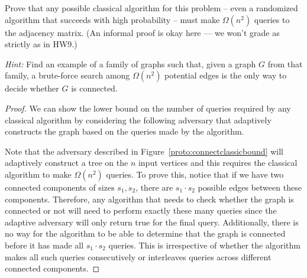 \begin{solution}[label=ques:4a]
  \begin{question}
    Prove that any possible classical algorithm for this problem -- even a randomized algorithm that succeeds with high probability -- must make $\Omega(n^2)$ queries to the adjacency matrix.
(An informal proof is okay here --- we won't grade as strictly as in HW9.)

\noindent \textit{Hint:} Find an example of a family of graphs such that, given a graph $G$ from that family, a brute-force search among $\Omega(n^2)$ potential edges is the only way to decide whether $G$ is connected.
  \end{question}
  \tcblower{}
  \begin{proof}[Proof]
    We can show the lower bound on the number of queries required by any classical algorithm by considering the following adversary that adaptively constructs the graph based on the queries made by the algorithm.\par
    Note that the adversary described in Figure~\ref{proto:connectclassicbound} will adaptively construct a tree on the $n$ input vertices and this requires the classical algorithm to make $\Omega(n^2)$ queries. To prove this, notice that if we have two connected components of sizes $s_1, s_2$, there are $s_1\cdot s_2$ possible edges between these components. Therefore, any algorithm that needs to check whether the graph is connected or not will need to perform exactly these many queries since the adaptive adversary will only return true for the final query. Additionally, there is no way for the algorithm to be able to determine that the graph is connected before it has made all $s_1\cdot s_2$ queries. This is irrespective of whether the algorithm makes all such queries consecutively or interleaves queries across different connected components.\par

\end{proof}
\end{solution}
